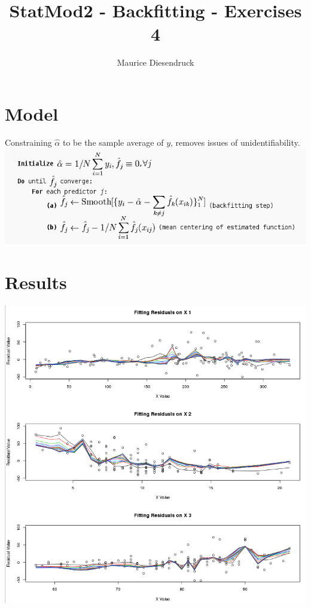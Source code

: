 \documentclass[12pt,letterpaper]{article}
\author{Maurice Diesendruck}
\title{StatMod2 - Backfitting - Exercises 4}
\begin{document}

\maketitle


\section{Model}

Constraining $\hat{\alpha}$ to be the sample average of $y$, 
removes issues of unidentifiability.\\

\includegraphics[width=.7\textwidth]{backfitting-function.png}

\section{Results}

\includegraphics[width=.7\textwidth]{backfitting.png}
\end{document}
